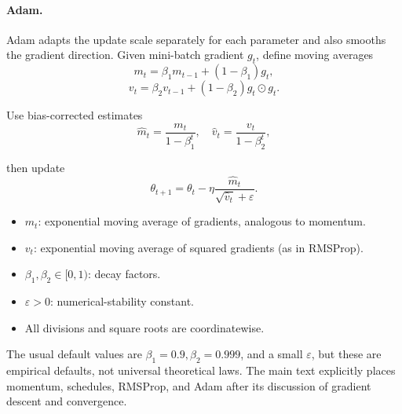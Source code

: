 \documentclass[11pt,a4paper]{article}
\theoremstyle{definition}
\begin{document}
\paragraph*{Adam.}
Adam adapts the update scale separately for each parameter and also smooths the gradient direction. Given mini-batch gradient $g_t$, define moving averages
\[
m_t = \beta_1 m_{t-1} + (1 - \beta_1)g_t,
\]
\[
v_t = \beta_2 v_{t-1} + (1 - \beta_2)g_t \odot g_t.
\]

Use bias-corrected estimates
\[
\widehat{m}_t = \frac{m_t}{1 - \beta_1^t}, \quad \widehat{v}_t = \frac{v_t}{1 - \beta_2^t},
\]

then update
\[
\boxed{\theta_{t+1} = \theta_t - \eta \frac{\widehat{m}_t}{\sqrt{\widehat{v}_t} + \varepsilon}.}
\]

\begin{itemize}
    \item $m_t$: exponential moving average of gradients, analogous to momentum.
    \item $v_t$: exponential moving average of squared gradients (as in RMSProp).
    \item $\beta_1, \beta_2 \in [0, 1)$: decay factors.
    \item $\varepsilon > 0$: numerical-stability constant.
    \item All divisions and square roots are coordinatewise.
\end{itemize}

The usual default values are $\beta_1 = 0.9, \beta_2 = 0.999$, and a small $\varepsilon$, but these are empirical defaults, not universal theoretical laws. The main text explicitly places momentum, schedules, RMSProp, and Adam after its discussion of gradient descent and convergence.
\end{document}
